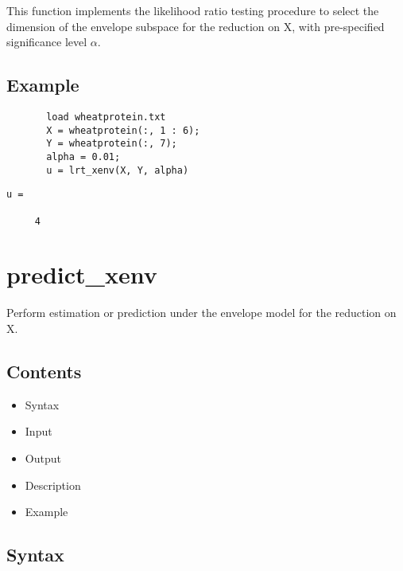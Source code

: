 \documentclass[a4paper,11pt,openany]{memoir}
\begin{document}
\begin{par}
This function implements the likelihood ratio testing procedure to select the dimension of the envelope subspace for the reduction on X, with pre-specified significance level $\alpha$.
\end{par} \vspace{1em}


\subsection*{Example}


\begin{verbatim}       load wheatprotein.txt
       X = wheatprotein(:, 1 : 6);
       Y = wheatprotein(:, 7);
       alpha = 0.01;
       u = lrt_xenv(X, Y, alpha)\end{verbatim}
    
        \color{lightgray}\ttfamily \begin{verbatim}
u =

     4

\end{verbatim} \rmfamily
\color{black}
    

\newpage

\rmfamily
\color{black}\section{predict\_xenv}

\begin{par}
Perform estimation or prediction under the envelope model for the reduction on X.
\end{par} \vspace{1em}

\subsection*{Contents}

\begin{itemize}
\setlength{\itemsep}{-1ex}
   \item Syntax
   \item Input
   \item Output
   \item Description
   \item Example
\end{itemize}


\subsection*{Syntax}
\end{document}
